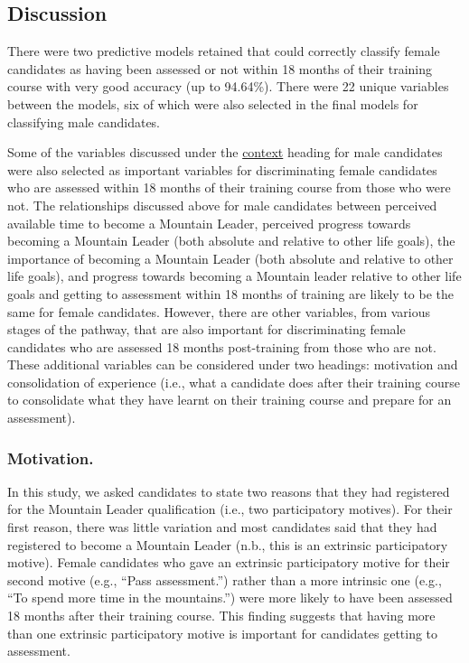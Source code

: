 \documentclass[
  12pt,
  a4paper,
]{book}
\begin{document}
\hypertarget{pra-demale-gta-discussion}{%
\subsection{Discussion}\label{pra-demale-gta-discussion}}

There were two predictive models retained that could correctly classify female candidates as having been assessed or not within 18 months of their training course with very good accuracy (up to 94.64\%). There were 22 unique variables between the models, six of which were also selected in the final models for classifying male candidates.

Some of the variables discussed under the \protect\hyperlink{context}{context} heading for male candidates were also selected as important variables for discriminating female candidates who are assessed within 18 months of their training course from those who were not. The relationships discussed above for male candidates between perceived available time to become a Mountain Leader, perceived progress towards becoming a Mountain Leader (both absolute and relative to other life goals), the importance of becoming a Mountain Leader (both absolute and relative to other life goals), and progress towards becoming a Mountain leader relative to other life goals and getting to assessment within 18 months of training are likely to be the same for female candidates. However, there are other variables, from various stages of the pathway, that are also important for discriminating female candidates who are assessed 18 months post-training from those who are not. These additional variables can be considered under two headings: motivation and consolidation of experience (i.e., what a candidate does after their training course to consolidate what they have learnt on their training course and prepare for an assessment).

\hypertarget{pra-female-discussion-motivation}{%
\subsubsection{Motivation.}\label{pra-female-discussion-motivation}}

In this study, we asked candidates to state two reasons that they had registered for the Mountain Leader qualification (i.e., two participatory motives). For their first reason, there was little variation and most candidates said that they had registered to become a Mountain Leader (n.b., this is an extrinsic participatory motive). Female candidates who gave an extrinsic participatory motive for their second motive (e.g., ``Pass assessment.'') rather than a more intrinsic one (e.g., ``To spend more time in the mountains.'') were more likely to have been assessed 18 months after their training course. This finding suggests that having more than one extrinsic participatory motive is important for candidates getting to assessment.
\end{document}

